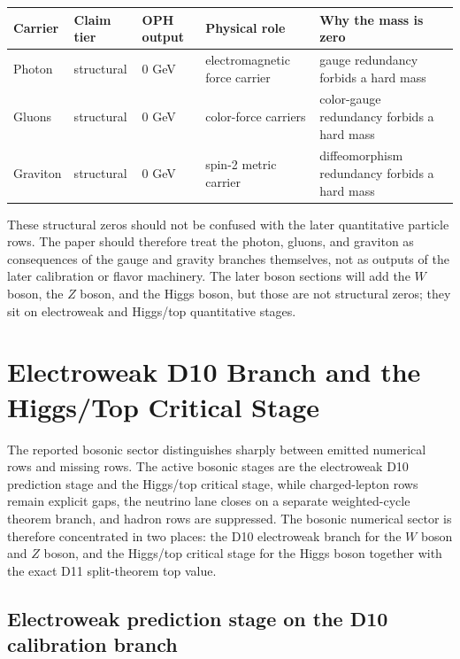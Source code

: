 \documentclass[11pt]{article}
\begin{document}
\begin{table}[h]
\centering
\small
\begin{tabular}{@{}>{\raggedright\arraybackslash}p{}>{\raggedright\arraybackslash}p{}>{\raggedright\arraybackslash}p{}>{\raggedright\arraybackslash}p{}>{\raggedright\arraybackslash}p{}@{}}
\toprule
Carrier & Claim tier & OPH output & Physical role & Why the mass is zero \\
\midrule
Photon & structural & \(0\) GeV & electromagnetic force carrier & gauge redundancy forbids a hard mass \\
Gluons & structural & \(0\) GeV & color-force carriers & color-gauge redundancy forbids a hard mass \\
Graviton & structural & \(0\) GeV & spin-2 metric carrier & diffeomorphism redundancy forbids a hard mass \\
\bottomrule
\end{tabular}
\end{table}

These structural zeros should not be confused with the later quantitative particle rows. The
paper should therefore treat the photon, gluons, and graviton as consequences of the
gauge and gravity branches themselves, not as outputs of the later calibration or flavor
machinery. The later boson sections will add the \(W\) boson, the \(Z\) boson, and the Higgs
boson, but those are not structural zeros; they sit on electroweak and Higgs/top quantitative stages.

\section{Electroweak D10 Branch and the Higgs/Top Critical Stage}

The reported bosonic sector distinguishes sharply between emitted numerical rows and
missing rows. The active bosonic stages are the electroweak
D10 prediction stage and the Higgs/top critical stage, while charged-lepton rows
remain explicit gaps, the neutrino lane closes on a separate weighted-cycle theorem branch, and hadron rows are suppressed. The bosonic numerical
sector is therefore concentrated in two places: the D10 electroweak branch for the \(W\) boson and \(Z\) boson, and
the Higgs/top critical stage for the Higgs boson together with the exact D11 split-theorem top value.

\subsection{Electroweak prediction stage on the D10 calibration branch}
\end{document}
